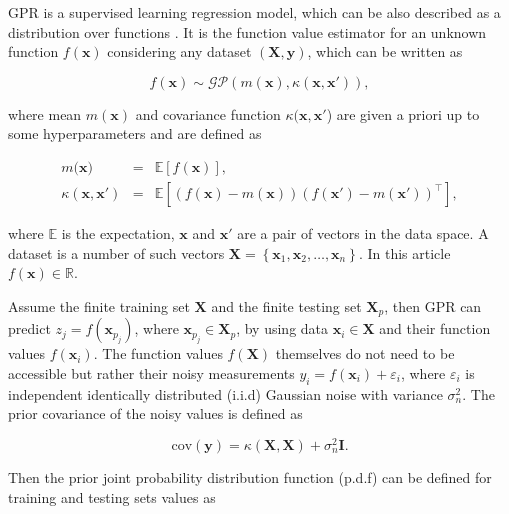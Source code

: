 \documentclass{ifacconf}
\begin{document}
GPR is a supervised learning regression model, which can be also described
as a distribution over functions \citep{ecc19ref:Rasmussen_Gaussian_Processes}.
It is the function value estimator for an unknown function $f(\mathbf{x})$
considering any dataset $(\mathbf{X},\mathbf{y})$, which can be written
as 

\[
f(\mathbf{x})\sim\mathcal{GP}\left(m(\mathbf{x}),\kappa(\mathbf{x},\mathbf{x}')\right),
\]

\noindent where mean $m(\mathbf{x})$ and covariance function $\kappa(\mathbf{x},\mathbf{x}'$)
are given a priori up to some hyperparameters and are defined as

\begin{eqnarray*}
m(\mathbf{x)} & = & \mathbb{E}\left[f(\mathbf{x})\right],\\
\kappa(\mathbf{x},\mathbf{x}') & = & \mathbb{E}\left[\left(f(\mathbf{x})-m(\mathbf{x})\right)\left(f(\mathbf{x}')-m(\mathbf{x}')\right)^{\top}\right],
\end{eqnarray*}

\noindent where $\mathbb{E}$ is the expectation, $\mathbf{x}$ and
$\mathbf{x}'$ are a pair of vectors in the data space. A dataset
is a number of such vectors $\mathbf{X}=\left\{ \mathbf{x}_{1},\mathbf{x}_{2},\ldots,\mathbf{x}_{n}\right\} $.
In this article $f(\mathbf{x})\in\mathbb{R}.$

Assume the finite training set $\mathbf{X}$ and the finite testing
set $\mathbf{X}_{p}$, then GPR can predict $z_{j}=f(\mathbf{x}_{p_{j}}^{\mathrm{}})$,
where $\mathbf{x}_{p_{j}}^{\mathrm{}}\in\mathbf{X}_{p}$, by using
data $\mathbf{x}_{i}\in\mathbf{X}$ and their function values $f(\mathbf{x}_{i})$.
The function values $f(\mathbf{X})$ themselves do not need to be
accessible but rather their noisy measurements $y_{i}=f(\mathbf{x}_{i})+\varepsilon_{i}$,
where $\varepsilon_{i}$ is independent identically distributed (i.i.d)
Gaussian noise with variance $\sigma_{n}^{2}$. The prior covariance
of the noisy values is defined as 

\begin{equation}
\mathrm{cov}(\mathbf{y})=\kappa(\mathbf{X},\mathbf{X})+\sigma_{n}^{2}\mathbf{I}.\label{eq:covariance-noisy-measurements}
\end{equation}

Then the prior joint probability distribution function (p.d.f) can
be defined for training and testing sets values as 
\end{document}
